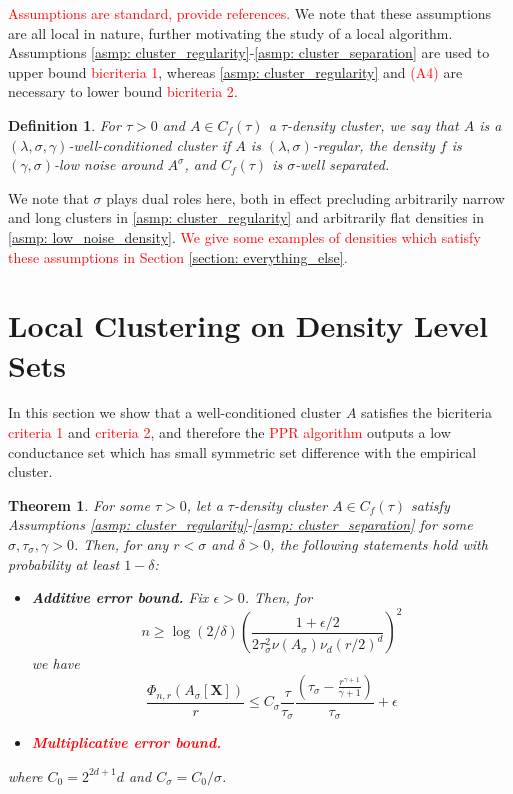 \documentclass{article}
\newcommand{\Asig}{A_{\sigma}}
\theoremstyle{aldenthm}
\newtheorem{theorem}{Theorem}
\newtheorem{definition}{Definition}
\theoremstyle{remark}
\begin{document}
\textcolor{red}{Assumptions are standard, provide references.} We note that these assumptions are all local in nature, further motivating the study of a local algorithm. Assumptions \ref{asmp: cluster_regularity}-\ref{asmp: cluster_separation} are used to upper bound \textcolor{red}{bicriteria 1}, whereas \ref{asmp: cluster_regularity} and \textcolor{red}{(A4)} are necessary to lower bound \textcolor{red}{bicriteria 2}. 

\begin{definition}
	For $\tau > 0$ and $A \in C_f(\tau)$ a $\tau$-density cluster, we say that $A$ is a \textit{$(\lambda, \sigma, \gamma)$-well-conditioned cluster} if $A$ is $(\lambda,\sigma)$-regular, the density $f$ is $(\gamma, \sigma)$-low noise around $A^{\sigma}$, and $C_f(\tau)$ is $\sigma$-well separated.
\end{definition}
We note that $\sigma$ plays dual roles here, both in effect precluding arbitrarily narrow and long clusters in \ref{asmp: cluster_regularity} and arbitrarily flat densities in \ref{asmp: low_noise_density}. \textcolor{red}{We give some examples of densities which satisfy these assumptions in Section \ref{section: everything_else}.}

\section{Local Clustering on Density Level Sets}

In this section we show that a well-conditioned cluster $A$ satisfies the bicriteria \textcolor{red}{criteria 1} and \textcolor{red}{criteria 2}, and therefore the \textcolor{red}{PPR algorithm} outputs a low conductance set  which has small symmetric set difference with the empirical cluster. 

\begin{theorem}
	\label{thm: conductance_upper_bound}
	For some $\tau > 0$, let a $\tau$-density cluster $A \in C_f(\tau)$ satisfy Assumptions \ref{asmp: cluster_regularity}-\ref{asmp: cluster_separation} for some $\sigma, \tau_{\sigma}, \gamma > 0$. Then, for any $r < \sigma$ and $\delta > 0$, the following statements hold with probability at least $1 - \delta$: 
	\begin{itemize}
		\item 
		\textbf{Additive error bound.} Fix $\epsilon > 0$. Then, for
		\begin{equation}
		\label{eqn: conductance_sample_complexity}
		n \geq \log(2/\delta)\left(\frac{1 + \epsilon/2}{2 \tau_{\sigma}^2 \nu(\Asig) \nu_d (r/2)^d}\right)^2 
		\end{equation}
		we have
		\begin{equation}
		\label{eqn: conductance_additive_error_bound}
		\frac{\Phi_{n,r}(\Asig[\mathbf{X}])}{r} \leq C_{\sigma} \frac{\tau}{\tau_{\sigma}} \frac{(\tau_{\sigma} - \frac{r^{\gamma+1}}{\gamma+1})}{\tau_{\sigma}} + \epsilon
		\end{equation}
		\item
		\textcolor{red}{\textbf{Multiplicative error bound.}}
	\end{itemize}
	where $C_0 = 2^{2d+1}d$ and $C_{\sigma} = C_0 / \sigma$. 
\end{theorem}
\end{document}
